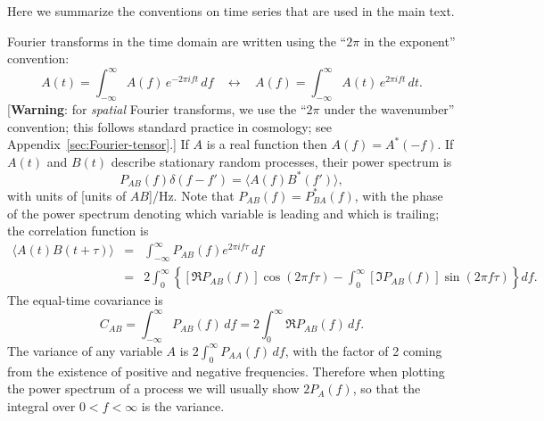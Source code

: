 Here we summarize the conventions on time series that are used in the main text.

Fourier transforms in the time domain are written using the ``$2\pi$ in the exponent'' convention:
\begin{equation}
A(t) = \int_{-\infty}^\infty A(f) \,e^{-2\pi i f t}\,df
~~~~\leftrightarrow~~~~
A(f) = \int_{-\infty}^\infty A(t) \,e^{2\pi i f t}\,dt.
\end{equation}
[{\bfseries Warning}: for {\em spatial} Fourier transforms, we use the ``$2\pi$ under the wavenumber'' convention; this follows standard practice in cosmology; see Appendix~\ref{sec:Fourier-tensor}.]
If $A$ is a real function then $A(f) = A^\ast(-f)$. If $A(t)$ and $B(t)$ describe stationary random processes, their power spectrum is
\begin{equation}
P_{AB}(f) \delta(f-f') = \langle A(f) B^\ast(f') \rangle,
\end{equation}
with units of [units of $AB$]/Hz. Note that $P_{AB}(f) = P^\ast_{BA}(f)$, with the phase of the power spectrum denoting which variable is leading and which is trailing; the correlation function is
\begin{eqnarray}
\langle A(t) B(t+\tau) \rangle &=& \int_{-\infty}^\infty P_{AB}(f) e^{2\pi i f \tau}\,df
\nonumber \\
&=& 2\int_0^\infty \left\{ [\Re P_{AB}(f)] \cos(2\pi f\tau) - \int_0^\infty [\Im P_{AB}(f)] \sin(2\pi f\tau) \right\}df.
\end{eqnarray}
The equal-time covariance is
\begin{equation}
C_{AB} = \int_{-\infty}^\infty P_{AB}(f)\,df = 2\int_0^\infty \Re P_{AB}(f)\,df.
\end{equation}
The variance of any variable $A$ is $2\int_0^\infty P_{AA}(f)\,df$, with the factor of 2 coming from the existence of positive and negative frequencies. Therefore when plotting the power spectrum of a process we will usually show $2P_A(f)$, so that the integral over $0<f<\infty$ is the variance.

